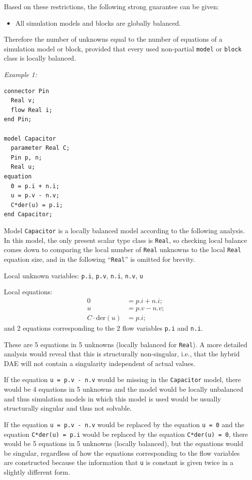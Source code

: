 Based on these restrictions, the following strong guarantee can be given:
\begin{itemize}
\item All simulation models and blocks are globally balanced.
\end{itemize}

\begin{nonnormative}
Therefore the number of unknowns equal to the number of equations of a simulation model or block, provided that every used non-partial \lstinline!model! or \lstinline!block! class is locally balanced.
\end{nonnormative}

\begin{example}
\emph{Example 1:}
\begin{lstlisting}[language=modelica]
connector Pin
  Real v;
  flow Real i;
end Pin;

model Capacitor
  parameter Real C;
  Pin p, n;
  Real u;
equation
  0 = p.i + n.i;
  u = p.v - n.v;
  C*der(u) = p.i;
end Capacitor;
\end{lstlisting}

Model \lstinline!Capacitor! is a locally balanced model according to the following analysis.
In this model, the only present scalar type class is \lstinline!Real!, so checking local balance comes down to comparing the local number of \lstinline!Real! unknowns to the local \lstinline!Real! equation size, and in the following ``\lstinline!Real!'' is omitted for brevity.

Local unknown variables: \lstinline!p.i!, \lstinline!p.v!, \lstinline!n.i!, \lstinline!n.v!, \lstinline!u!

Local equations:
\begin{align*}
0 &= p.i + n.i;\\
u &= p.v - n.v;\\
C \cdot \text{der}(u) &= p.i;
\end{align*}
and 2 equations corresponding to the 2 flow variables \lstinline!p.i! and \lstinline!n.i!.

These are 5 equations in 5 unknowns (locally balanced for \lstinline!Real!).
A more detailed analysis would reveal that this is structurally non-singular, i.e., that the hybrid DAE will not contain a singularity independent of actual values.

If the equation \lstinline!u = p.v - n.v! would be missing in the \lstinline!Capacitor! model, there would be 4 equations in 5 unknowns and the model would be locally unbalanced and thus simulation models in which this model is used would be usually structurally singular and thus not solvable.

If the equation \lstinline!u = p.v - n.v! would be replaced by the equation \lstinline!u = 0! and the equation \lstinline!C*der(u) = p.i! would be replaced by the equation \lstinline!C*der(u) = 0!, there would be 5 equations in 5 unknowns (locally balanced), but the equations would be singular, regardless of how the equations corresponding to the flow variables are constructed because the information that \lstinline!u! is constant is given twice in a slightly different form.
\end{example}

